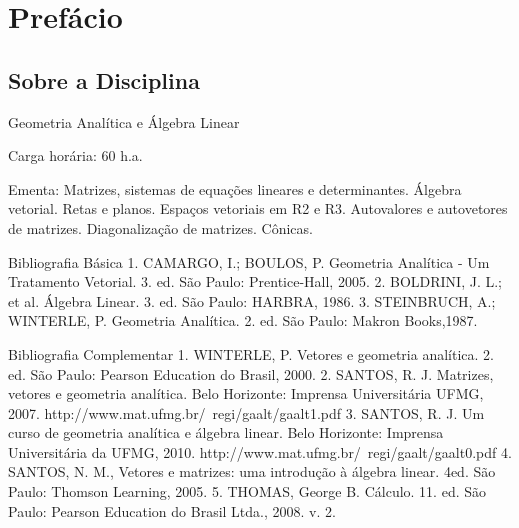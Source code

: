 \chapter*{Prefácio}

\section*{Sobre a Disciplina}

Geometria Analítica e Álgebra Linear

Carga horária: 60 h.a.

Ementa: Matrizes, sistemas de equações lineares e determinantes. Álgebra
vetorial. Retas e planos. Espaços vetoriais em R2 e R3. Autovalores e
autovetores de matrizes. Diagonalização de matrizes. Cônicas.

Bibliografia Básica
1. CAMARGO, I.; BOULOS, P. Geometria Analítica - Um Tratamento Vetorial. 3. ed. São Paulo: Prentice-Hall, 2005.
2. BOLDRINI, J. L.; et al. Álgebra Linear. 3. ed. São Paulo: HARBRA, 1986.
3. STEINBRUCH, A.; WINTERLE, P. Geometria Analítica. 2. ed. São Paulo: Makron Books,1987.

Bibliografia Complementar
1. WINTERLE, P. Vetores e geometria analítica. 2. ed. São Paulo: Pearson Education do Brasil, 2000.
2. SANTOS, R. J. Matrizes, vetores e geometria analítica. Belo Horizonte: Imprensa Universitária UFMG, 2007. http://www.mat.ufmg.br/~regi/gaalt/gaalt1.pdf
3. SANTOS, R. J. Um curso de geometria analítica e álgebra linear. Belo Horizonte: Imprensa Universitária da UFMG, 2010. http://www.mat.ufmg.br/~regi/gaalt/gaalt0.pdf
4. SANTOS, N. M., Vetores e matrizes: uma introdução à álgebra linear. 4ed. São Paulo: Thomson Learning, 2005.
5. THOMAS, George B. Cálculo. 11. ed. São Paulo: Pearson Education do Brasil Ltda., 2008. v. 2.

